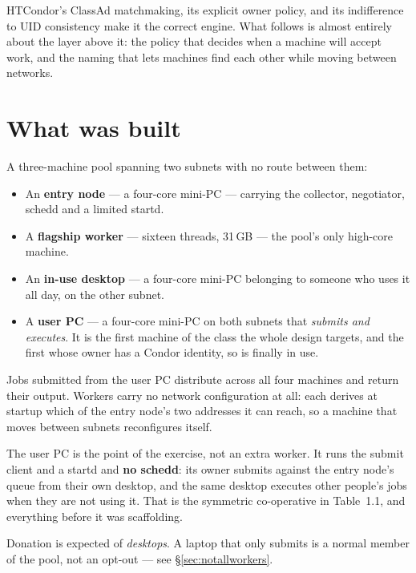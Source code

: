 HTCondor's ClassAd matchmaking, its explicit owner policy, and its indifference
to UID consistency make it the correct engine. What follows is almost entirely
about the layer above it: the policy that decides when a machine will accept
work, and the naming that lets machines find each other while moving between
networks.

\section{What was built}

A three-machine pool spanning two subnets with no route between them:

\begin{itemize}
  \item An \textbf{entry node} --- a four-core mini-PC --- carrying the collector,
        negotiator, schedd and a limited startd.
  \item A \textbf{flagship worker} --- sixteen threads, 31\,GB --- the pool's
        only high-core machine.
  \item An \textbf{in-use desktop} --- a four-core mini-PC belonging to someone
        who uses it all day, on the other subnet.
  \item A \textbf{user PC} --- a four-core mini-PC on both subnets that
        \emph{submits and executes}. It is the first machine of the class the
        whole design targets, and the first whose owner has a Condor identity,
        so  is finally in use.
\end{itemize}

Jobs submitted from the user PC distribute across all four machines and return
their output. Workers carry no network configuration at all: each derives at
startup which of the entry node's two addresses it can reach, so a machine that
moves between subnets reconfigures itself.

\begin{keypoint}
The user PC is the point of the exercise, not an extra worker. It runs the
submit client and a startd and \textbf{no schedd}: its owner submits against
the entry node's queue from their own desktop, and the same desktop executes
other people's jobs when they are not using it. That is the symmetric
co-operative in Table~1.1, and everything before it was scaffolding.

Donation is expected of \emph{desktops}. A laptop that only submits is a
normal member of the pool, not an opt-out --- see \S\ref{sec:notallworkers}.
\end{keypoint}
